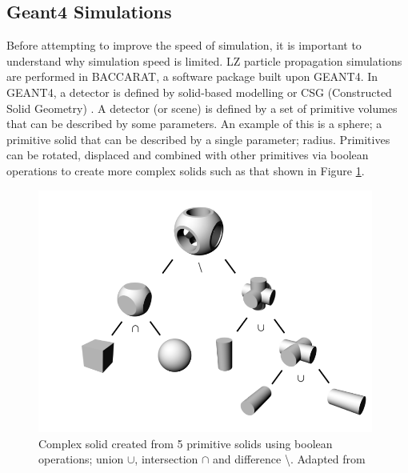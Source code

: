 \subsection{Geant4 Simulations}
\par
Before attempting to improve the speed of simulation, it is important to understand why simulation speed is limited. 
LZ particle propagation simulations are performed in BACCARAT, a software package built upon GEANT4.
In GEANT4, a detector is defined by solid-based modelling or CSG (Constructed Solid Geometry) \cite{geant4_geometry_ref}.
A detector (or scene) is defined by a set of primitive volumes that can be described by some parameters.
An example of this is a sphere; a primitive solid that can be described by a single parameter; radius.
Primitives can be rotated, displaced and combined with other primitives via boolean operations to create more complex solids such as that shown in Figure \ref{fig:csg_geometry_example}.
\begin{figure}[!htbp]
\includegraphics[height=8cm]{Figures/Simulations/csg_geometry.png}
\centering
\caption{Complex solid created from 5 primitive solids using boolean operations; union $\cup$, intersection $\cap$ and difference \textbackslash. Adapted from \cite{csg_geomtry_ref}}
\label{fig:csg_geometry_example}
\end{figure}

